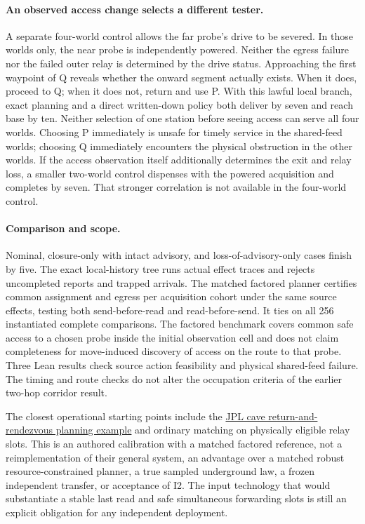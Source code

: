 \documentclass[11pt]{article}
\begin{document}
\paragraph{An observed access change selects a different tester.}
A separate four-world control allows the far probe's drive to be
severed. In those worlds only, the near probe is independently powered.
Neither the egress failure nor the failed outer relay is determined
by the drive status. Approaching the first waypoint of Q reveals
whether the onward segment actually exists. When it does, proceed
to Q; when it does not, return and use P. With this lawful local
branch, exact planning and a direct written-down policy both deliver
by seven and reach base by ten. Neither selection of one station
before seeing access can serve all four worlds. Choosing P
immediately is unsafe for timely service in the shared-feed worlds;
choosing Q immediately encounters the physical obstruction in the
other worlds. If the access observation itself additionally determines
the exit and relay loss, a smaller two-world control dispenses with
the powered acquisition and completes by seven. That stronger
correlation is not available in the four-world control.

\paragraph{Comparison and scope.}
Nominal, closure-only with intact advisory, and loss-of-advisory-only
cases finish by five. The exact local-history tree runs actual
effect traces and rejects uncompleted reports and trapped arrivals.
The matched factored planner certifies common assignment and egress
per acquisition cohort under the same source effects, testing both
send-before-read and read-before-send. It ties on all 256
instantiated complete comparisons. The factored benchmark covers
common safe access to a chosen probe inside the initial observation
cell and does not claim completeness for move-induced discovery
of access on the route to that probe. Three Lean results check
source action feasibility and physical shared-feed failure.
The timing and route checks do not alter the occupation criteria
of the earlier two-hop corridor result.

The closest operational starting points include the
\href{https://superintelligence.jpl.nasa.gov/public/documents/papers/PlanRob-2020-Planning-and-Optimization-for-Multi-Robot-Planetary-Cave-Exploration.pdf}{JPL cave return-and-rendezvous planning example}
and ordinary matching on physically eligible relay slots. This
is an authored calibration with a matched factored reference, not
a reimplementation of their general system, an advantage over a
matched robust resource-constrained planner, a true sampled
underground law, a frozen independent transfer, or acceptance of I2.
The input technology that would substantiate a stable last read and
safe simultaneous forwarding slots is still an explicit obligation
for any independent deployment.
\end{document}
